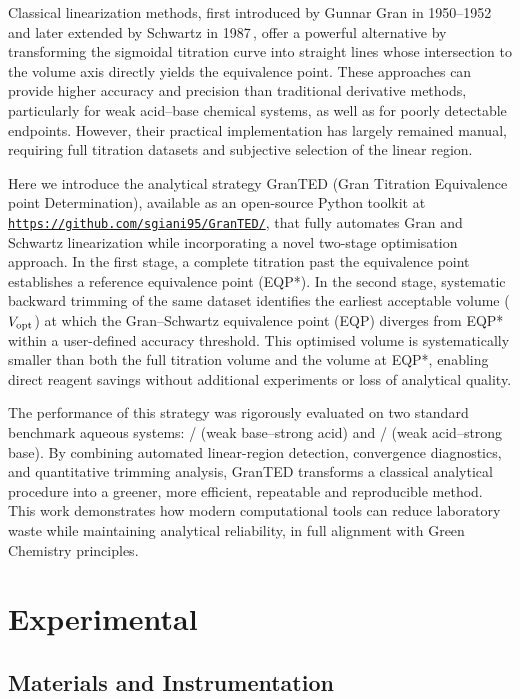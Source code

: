 \documentclass[twoside,twocolumn,9pt]{article}
\begin{document}
Classical linearization methods, first introduced by Gunnar Gran in 1950--1952\,\cite{Gran1950,Gran1952} and later extended by Schwartz in 1987\,\cite{Schwartz1987}, offer a powerful alternative by transforming the sigmoidal titration curve into straight lines whose intersection to the volume axis directly yields the equivalence point.
These approaches can provide higher accuracy and precision than traditional derivative methods, particularly for weak acid--base chemical systems, as well as for poorly detectable endpoints.
However, their practical implementation has largely remained manual, requiring full titration datasets and subjective selection of the linear region.\cite{Macc1989, MICHALOWSKI2005, Martin}

Here we introduce the analytical strategy \textsf{GranTED} (Gran Titration Equivalence point Determination), available as an open-source Python toolkit at \href{https://github.com/sgiani95/GranTED/}{\texttt{https://github.com/sgiani95/GranTED/}}, that fully automates Gran and Schwartz linearization while incorporating a novel two-stage optimisation approach.
In the first stage, a complete titration past the equivalence point establishes a reference equivalence point (EQP*).
In the second stage, systematic backward trimming of the same dataset identifies the earliest acceptable volume (\(V_{\rm opt}\)) at which the Gran--Schwartz equivalence point (EQP) diverges from EQP* within a user-defined accuracy threshold.
This optimised volume is systematically smaller than both the full titration volume and the volume at EQP*, enabling direct reagent savings without additional experiments or loss of analytical quality.

The performance of this strategy was rigorously evaluated on two standard benchmark aqueous systems: / (weak base--strong acid) and / (weak acid--strong base). By combining automated linear-region detection, convergence diagnostics, and quantitative trimming analysis, \textsf{GranTED} transforms a classical analytical procedure into a greener, more efficient, repeatable and reproducible method.
This work demonstrates how modern computational tools can reduce laboratory waste while maintaining analytical reliability, in full alignment with Green Chemistry principles.

\section*{Experimental}

\subsection*{Materials and Instrumentation}
\end{document}
